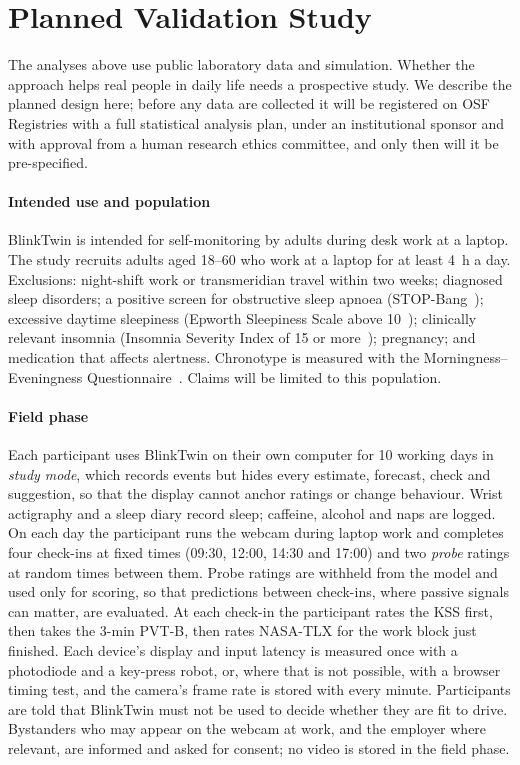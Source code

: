 \section{Planned Validation Study}
\label{sec:protocol}

The analyses above use public laboratory data and simulation. Whether the approach helps real people in daily life needs a prospective study. We describe the planned design here; before any data are collected it will be registered on OSF Registries with a full statistical analysis plan, under an institutional sponsor and with approval from a human research ethics committee, and only then will it be pre-specified.

\paragraph*{Intended use and population} BlinkTwin is intended for self-monitoring by adults during desk work at a laptop. The study recruits adults aged 18--60 who work at a laptop for at least 4~h a day. Exclusions: night-shift work or transmeridian travel within two weeks; diagnosed sleep disorders; a positive screen for obstructive sleep apnoea (STOP-Bang~\cite{chung2008stop}); excessive daytime sleepiness (Epworth Sleepiness Scale above 10~\cite{johns1991new}); clinically relevant insomnia (Insomnia Severity Index of 15 or more~\cite{bastien2001validation}); pregnancy; and medication that affects alertness. Chronotype is measured with the Morningness--Eveningness Questionnaire~\cite{horne1976self}. Claims will be limited to this population.

\paragraph*{Field phase} Each participant uses BlinkTwin on their own computer for 10 working days in \emph{study mode}, which records events but hides every estimate, forecast, check and suggestion, so that the display cannot anchor ratings or change behaviour. Wrist actigraphy and a sleep diary record sleep; caffeine, alcohol and naps are logged. On each day the participant runs the webcam during laptop work and completes four check-ins at fixed times (09:30, 12:00, 14:30 and 17:00) and two \emph{probe} ratings at random times between them. Probe ratings are withheld from the model and used only for scoring, so that predictions between check-ins, where passive signals can matter, are evaluated. At each check-in the participant rates the KSS first, then takes the 3-min PVT-B, then rates NASA-TLX for the work block just finished. Each device's display and input latency is measured once with a photodiode and a key-press robot, or, where that is not possible, with a browser timing test, and the camera's frame rate is stored with every minute. Participants are told that BlinkTwin must not be used to decide whether they are fit to drive. Bystanders who may appear on the webcam at work, and the employer where relevant, are informed and asked for consent; no video is stored in the field phase.

